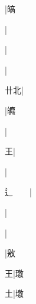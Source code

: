 \begin{multicols}{2}
{{\cjk{}{\cnsym{}　}{\cnsym{}　}{\cnsym{}　}}|{\cjk{}皜}\par
{\cjk{}{\cnsym{}　}{\cnsym{}　}{\cnsym{}　}}|{}\par
{\cjk{}{\cnsym{}　}{\cnsym{}　}{\cnsym{}　}}|{}\par
{}|{}\par
{\cjk{}{\cnsym{}　}卄北}|{}\par
{\cjk{}{\cnsym{}　}{\cnsym{}　}{\cnsym{}　}}|{\cjk{}皫}\par
{\cjk{}{\cnsym{}　}{\cnsym{}　}{\cnsym{}　}}|{}\par
{\cjk{}{\cnsym{}　}{\cnsym{}　}王}|{}\par
{\cjk{}{\cnsym{}　}{\cnsym{}　}{\cnsym{}　}}|{}\par
{\cjk{}辶{\cnsym{}　}{\cnsym{}　}}|{}\par
{\cjk{}{\cnsym{}　}{\cnsym{}　}{\cnsym{}　}}|{}\par
{\cjk{}{\cnsym{}　}{\cnsym{}　}{\cnsym{}　}}|{}\par
{\cjk{}{\cnsym{}　}{\cnsym{}　}{\cnsym{}　}}|{\cjk{}敫}\par
{\cjk{}{\cnsym{}　}{\cnsym{}　}王}|{\cjk{}璬}\par
{\cjk{}{\cnsym{}　}{\cnsym{}　}土}|{\cjk{}墽}\par
}
\end{multicols}
